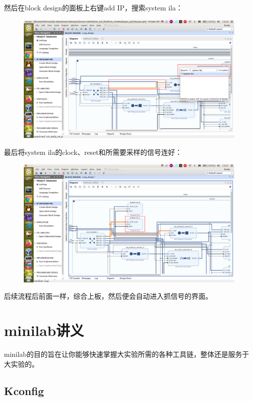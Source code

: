 \documentclass[lang=cn,11pt,a4paper]{elegantpaper}
\begin{document}
然后在block design的面板上右键add IP，搜索system ila：

\begin{figure}[H]
\centering
\includegraphics[width=\linewidth]{image/system_ila_2.png}
\end{figure}

最后将system ila的clock、reset和所需要采样的信号连好：
\begin{figure}[H]
\centering
\includegraphics[width=\linewidth]{image/system_ila_3.png}
\end{figure}

后续流程后前面一样，综合上板，然后便会自动进入抓信号的界面。

\section{minilab讲义}
minilab的目的旨在让你能够快速掌握大实验所需的各种工具链，整体还是服务于大实验的。

\subsection{Kconfig}
\end{document}

